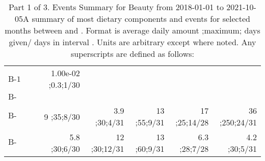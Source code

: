 \begin{table}[H]
\begin{tabular}{|l|r|r|r|r|r|}
$\textrm{B-1}$&1.00e-02 ;0.3;1/30&&&&\\
$\textrm{B-2(mg)}$&&&&&\\
$\textrm{B-3(mg)}$&9 ;35;8/30&3.9 ;30;4/31&13 ;55;9/31&17 ;25;14/28&36 ;250;24/31\\
$\textrm{B-6(mg)}$&5.8 ;30;6/30&12 ;30;12/31&13 ;60;9/31&6.3 ;28;7/28&4.2 ;30;5/31\\
\hline
\end{tabular}
\caption{Part 1 of 3.  Events Summary for Beauty   from 2018-01-01 to 2021-10-05A summary of most dietary components and events  for selected months between \mjmdatemin and \mjmdatemax. Format is average daily amount ;maximum; days given/ days in interval . Units are arbitrary except where noted. Any  superscripts are defined as follows:  \mjmsuperscripts}
\end{table}
